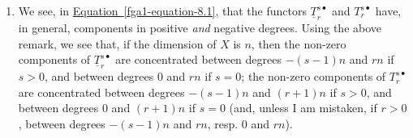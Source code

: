 \begin{remarks}{}
\begin{enumerate}
    \item{}We see, in \hyperref[fga1-equation-8.1]{Equation~\ref*{fga1-equation-8.1}}, that the functors \(\underline {T}_r^{s\bullet }\) and \(T_r^{s\bullet }\) have, in general, components in positive \emph{and} negative degrees.
      Using the above remark, we see that, if the dimension of \(X\) is \(n\), then the non-zero components of \(\underline {T}_r^{s\bullet }\) are concentrated between degrees \(-(s-1)n\) and \(rn\) if \(s>0\), and between degrees \(0\) and \(rn\) if \(s=0\); the non-zero components of \(T_r^{s\bullet }\) are concentrated between degrees \(-(s-1)n\) and \((r+1)n\) if \(s>0\), and between degrees \(0\) and \((r+1)n\) if \(s=0\) (and, unless I am mistaken, if \(r>0\), between degrees \(-(s-1)n\) and \(rn\), resp. \(0\) and \(rn\)).\end{enumerate}\end{remarks}